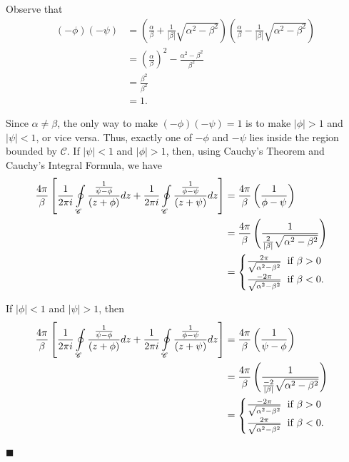 \documentclass{article}
\begin{document}
\noindent Observe that
\begin{align}
(-\phi)(-\psi) &= \left(\frac{\alpha}{\beta} + \frac{1}{|\beta|}\sqrt{\alpha^2 - \beta^2}\right)\left(\frac{\alpha}{\beta} - \frac{1}{|\beta|}\sqrt{\alpha^2 - \beta^2}\right) \\
&= \left(\frac{\alpha}{\beta}\right)^2 - \frac{\alpha^2 - \beta^2}{\beta^2} \\
&= \frac{\beta^2}{\beta^2} \\
&= 1.
\end{align}

\noindent Since $\alpha \neq \beta$, the only way to make $(-\phi)(-\psi) = 1$ is to make $|\phi| > 1$ and $|\psi| < 1$, or vice versa.  Thus, exactly one of $-\phi$ and $-\psi$ lies inside the region bounded by $\mathscr{C}$.  If $|\psi| < 1$ and $|\phi| > 1$, then, using Cauchy's Theorem and Cauchy's Integral Formula, we have
\begin{align}
\frac{4\pi}{\beta}\left[\frac{1}{2\pi i} \oint\limits_{\mathscr{C}}\frac{\frac{1}{\psi - \phi}}{(z+\phi)}dz +  \frac{1}{2\pi i} \oint\limits_{\mathscr{C}}\frac{\frac{1}{\phi - \psi}}{(z+\psi)}dz\right] &= \frac{4\pi}{\beta}\left(\frac{1}{\phi - \psi}\right) \\
&= \frac{4\pi}{\beta}\left(\frac{1}{\frac{2}{|\beta|}\sqrt{\alpha^2 - \beta^2}}\right) \\
&= \begin{cases}
\frac{2\pi}{\sqrt{\alpha^2 - \beta^2}} \hspace{2mm} \text{if } \beta > 0\\
\frac{-2\pi}{\sqrt{\alpha^2 - \beta^2}} \hspace{2mm} \text{if } \beta < 0.
\end{cases}
\end{align}

\noindent If $|\phi| < 1$ and $|\psi| > 1$, then
\begin{align}
\frac{4\pi}{\beta}\left[\frac{1}{2\pi i} \oint\limits_{\mathscr{C}}\frac{\frac{1}{\psi - \phi}}{(z+\phi)}dz +  \frac{1}{2\pi i} \oint\limits_{\mathscr{C}}\frac{\frac{1}{\phi - \psi}}{(z+\psi)}dz\right] &= \frac{4\pi}{\beta}\left(\frac{1}{\psi - \phi}\right) \\
&= \frac{4\pi}{\beta}\left(\frac{1}{\frac{-2}{|\beta|}\sqrt{\alpha^2 - \beta^2}}\right) \\
&= \begin{cases}
\frac{-2\pi}{\sqrt{\alpha^2 - \beta^2}} \hspace{2mm} \text{if } \beta > 0\\
\frac{2\pi}{\sqrt{\alpha^2 - \beta^2}} \hspace{2mm} \text{if } \beta < 0.
\end{cases}
\end{align}

\hfill$\blacksquare$
\end{document}
